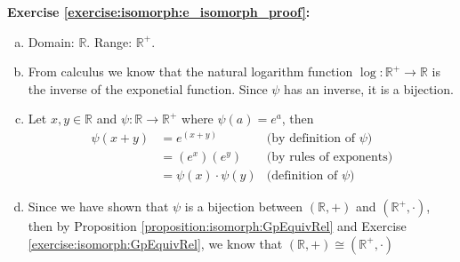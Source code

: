 \noindent\textbf{Exercise \ref{exercise:isomorph:e_isomorph_proof}:}
\begin{enumerate}[(a)]
\item
Domain: ${\mathbb R}$.  Range: ${\mathbb R}^+$.

\item
From calculus we know that the natural logarithm function $\log: {\mathbb R}^+ \rightarrow {\mathbb R}$ is the inverse of the exponetial function.  Since $\psi$ has an inverse, it is a bijection.  

\item
Let $x, y \in {\mathbb R}$ and $\psi: {\mathbb R} \rightarrow {\mathbb R}^+$ where $\psi(a) = e^a$, then
\begin{align*}
\psi(x + y) &= e^{(x + y)} &\text{(by definition of\ } \psi)
\\
&= (e^x)(e^y) &\text{(by rules of exponents)}
\\
&= \psi(x) \cdot \psi(y) &\text{(definition of\ } \psi)
\end{align*}

\item
Since we have shown that $\psi$ is a bijection between $({\mathbb R},+)$ and $({\mathbb R}^+,\cdot)$, then by Proposition \ref{proposition:isomorph:GpEquivRel} and Exercise \ref{exercise:isomorph:GpEquivRel}, we know that $({\mathbb R},+) \cong ({\mathbb R}^+,\cdot)$
\\
\end{enumerate}

